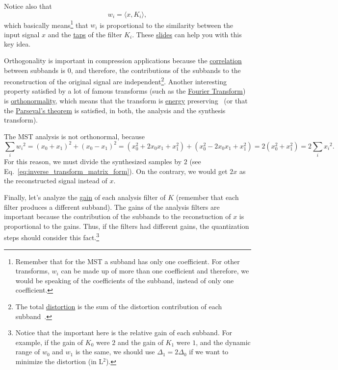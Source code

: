Notice also that
\begin{equation}
  w_i = \langle x, K_i\rangle,
\end{equation}
which basically means\footnote{Remember that for the MST a subband has
  only one coefficient. For other transforms, $w_i$ can be made up of
  more than one coefficient and therefore, we would be speaking of the
  coefficients of the subband, instead of only one coefficient.} that
  $w_i$ is proportional to the similarity between the input signal $x$
  and
  the \href{https://en.wikipedia.org/wiki/Finite_impulse_response}{taps}
  of the filter $K_i$. These
\href{https://cseweb.ucsd.edu/classes/fa17/cse166-a/lec13.pdf}{slides}
can help you with this key idea.

Orthogonality is important in compression applications because the
\href{https://en.wikipedia.org/wiki/Correlation_and_dependence}{correlation}
between subbands is 0, and therefore, the contributions of the
subbands to the reconstruction of the original signal are
independent\footnote{The total
  \href{https://en.wikipedia.org/wiki/Distortion}{distortion} is the
  sum of the distortion contribution of each
  subband~\cite{sayood2017introduction}.}. Another interesting
property satisfied by a lot of famous transforms (such as the
\href{https://en.wikipedia.org/wiki/Fourier_transform}{Fourier
  Transform}) is
\href{https://en.wikipedia.org/wiki/Orthonormality}{orthonormality},
which means that the transform is
\href{https://en.wikipedia.org/wiki/Energy_(signal_processing)}{energy}
preserving~\cite{sayood2017introduction} (or that the
\href{https://en.wikipedia.org/wiki/Parseval%27s_theorem}{Parseval's theorem}
  is satisfied, in both, the analysis and the synthesis transform).

The MST analysis is not orthonormal, because
\begin{equation}
  \sum_i {w_i}^2 =
  (x_0+x_1)^2 + (x_0-x_1)^2 =
  (x_0^2+2x_0x_1+x_1^2) + (x_0^2-2x_0x_1+x_1^2) =
  2(x_0^2+x_1^2) =
  2\sum_i {x_i}^2.
  \label{eq:No_Parseval}
\end{equation}
For this reason, we must divide the synthesized samples by $2$ (see
Eq.~\ref{eq:inverse_transform_matrix_form}). On the contrary, we would
get $2x$ as the reconstructed signal instead of $x$.

Finally, let's analyze the
\href{https://en.wikipedia.org/wiki/Filter_(signal_processing)}{gain}
of each analysis filter of $K$ (remember that each filter produces a
different subband). The gains of the analysis filters are important
because the contribution of the subbands to the reconstuction of $x$
is proportional to the gains. Thus, if the filters had
different gains, the quantization steps should consider this
fact.\footnote{Notice that the important here is the relative gain of
  each subband. For example, if the gain of $K_0$ were $2$ and the
  gain of $K_1$ were $1$, and the dynamic range of $w_0$ and $w_1$ is
  the same, we should use $\Delta_1=2\Delta_0$ if we want to minimize
  the distortion (in L$^2$).}

